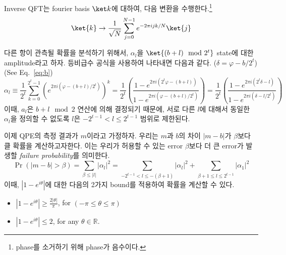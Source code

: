 \begin{definition}\label{def:IQFT}
  Inverse QFT는 fourier basis $\ket k$에 대하여, 다음 변환을 수행한다.\footnote{phase를 소거하기 위해 phase가 음수이다.}
  $$ \ket{k} \rightarrow \frac{1}{\sqrt{N}} \sum_{j=0}^{N-1} e^{-2\pi i jk/N} \ket{j}  $$
\end{definition}

\vspace{1em}
다른 항이 관측될 확률을 분석하기 위해서, $\alpha_l$을 $\ket{(b+l) \mod 2^t}$ state에 대한 amplitude라고 하자. 등비급수 공식을 사용하여 나타내면 다음과 같다. ($\delta = \varphi - b/2^t$) (See Eq.~\eqref{eq:b})
\begin{equation*}
  \alpha_l \equiv \frac{1}{2^t} \sum_{k=0}^{2^t-1}\left(e^{2 \pi i\left(\varphi-(b+l) / 2^t\right)}\right)^k=\frac{1}{2^t}\left(\frac{1-e^{2 \pi i\left(2^t \varphi-(b+l)\right)}}{1-e^{2 \pi i\left(\varphi-(b+l) / 2^t\right)}}\right)=\frac{1}{2^t}\left(\frac{1-e^{2 \pi i\left(2^t \delta-l\right)}}{1-e^{2 \pi i\left(\delta-l / 2^t\right)}}\right)
\end{equation*}
이때, $a_l$은 $b+l \mod 2$ 연산에 의해 결정되기 때문에, 서로 다른 $l$에 대해서 동일한 $\alpha_l$을 정의할 수 없도록 $l$은 $-2^{t-1} < l \le 2^{t-1}$ 범위로 제한된다.

\vspace{1em}

이제 QPE의 측정 결과가 $m$이라고 가정하자. 우리는 $m$과 $b$의 차이 $|m-b|$가 $\beta$보다 클 확률을 계산하고자한다. 이는 우리가 허용할 수 있는 error $\beta$보다 더 큰 error가 발생할 \textit{failure probability}를 의미한다.
\begin{equation}
  \Pr(|m-b| > \beta) = \sum_{\beta \le |l|} |\alpha_l|^2 = \sum_{-2^{t-1}<l \le -(\beta + 1)} |\alpha_l|^2 + \sum_{\beta+1 \le l \le 2^{t-1}}  |\alpha_1|^2 \label{eq:QPE-error-prob}
\end{equation}
이때, $|1-e^{i\theta}|$에 대한 다음의 2가지 bound를 적용하여 확률을 계산할 수 있다.
\begin{itemize}
  \item $|1-e^{i\theta}| \ge \frac{2 |\theta|}{\pi}$, for $(-\pi \le \theta \le \pi)$
  \item $|1-e^{i\theta}| \le 2$, for any $\theta \in \mathbb R$.
\end{itemize}


